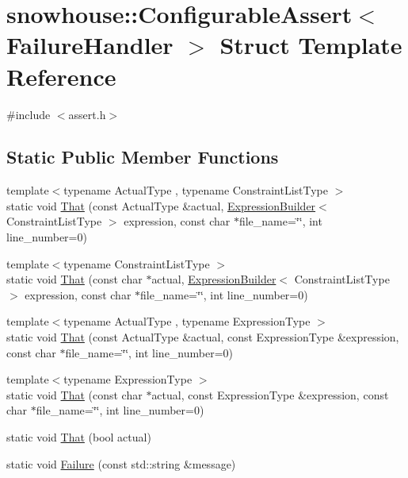 \hypertarget{structsnowhouse_1_1ConfigurableAssert}{}\section{snowhouse\+::Configurable\+Assert$<$ Failure\+Handler $>$ Struct Template Reference}
\label{structsnowhouse_1_1ConfigurableAssert}


{\ttfamily \#include $<$assert.\+h$>$}

\subsection*{Static Public Member Functions}
\begin{DoxyCompactItemize}
\item 
{\footnotesize template$<$typename Actual\+Type , typename Constraint\+List\+Type $>$ }\\static void \mbox{\hyperlink{structsnowhouse_1_1ConfigurableAssert_acbd3370fc5497894fc9f9db3f533e9a3}{That}} (const Actual\+Type \&actual, \mbox{\hyperlink{structsnowhouse_1_1ExpressionBuilder}{Expression\+Builder}}$<$ Constraint\+List\+Type $>$ expression, const char $\ast$file\+\_\+name=\char`\"{}\char`\"{}, int line\+\_\+number=0)
\item 
{\footnotesize template$<$typename Constraint\+List\+Type $>$ }\\static void \mbox{\hyperlink{structsnowhouse_1_1ConfigurableAssert_ac72d0d7325152192b8e8c8504bebe4fd}{That}} (const char $\ast$actual, \mbox{\hyperlink{structsnowhouse_1_1ExpressionBuilder}{Expression\+Builder}}$<$ Constraint\+List\+Type $>$ expression, const char $\ast$file\+\_\+name=\char`\"{}\char`\"{}, int line\+\_\+number=0)
\item 
{\footnotesize template$<$typename Actual\+Type , typename Expression\+Type $>$ }\\static void \mbox{\hyperlink{structsnowhouse_1_1ConfigurableAssert_ac3914cf3e2af0b4d0cc4a5826e51b331}{That}} (const Actual\+Type \&actual, const Expression\+Type \&expression, const char $\ast$file\+\_\+name=\char`\"{}\char`\"{}, int line\+\_\+number=0)
\item 
{\footnotesize template$<$typename Expression\+Type $>$ }\\static void \mbox{\hyperlink{structsnowhouse_1_1ConfigurableAssert_accf57cd0ec4adf4811ad6ae5304263b9}{That}} (const char $\ast$actual, const Expression\+Type \&expression, const char $\ast$file\+\_\+name=\char`\"{}\char`\"{}, int line\+\_\+number=0)
\item 
static void \mbox{\hyperlink{structsnowhouse_1_1ConfigurableAssert_a92fb92e2cbdc18889915c6effa87b89f}{That}} (bool actual)
\item 
static void \mbox{\hyperlink{structsnowhouse_1_1ConfigurableAssert_a08eabf3ac0349791258e771e07618107}{Failure}} (const std\+::string \&message)
\end{DoxyCompactItemize}


